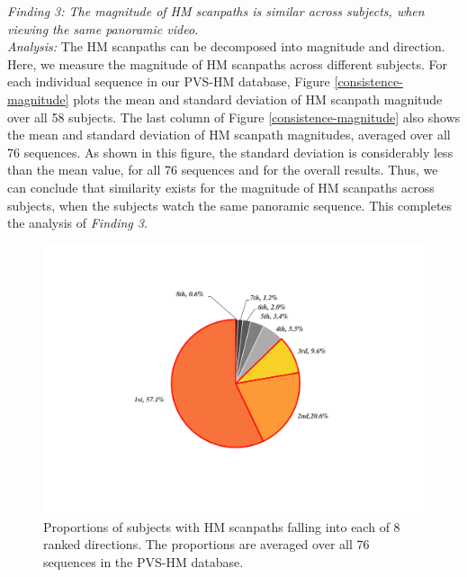 \documentclass[10pt,journal,compsoc]{IEEEtran}
\begin{document}
\emph{Finding 3: The magnitude of HM scanpaths is similar across subjects, when viewing the same panoramic video.}
\\ \textit{Analysis:} The HM scanpaths can be decomposed into magnitude and direction.
 Here, we measure the magnitude of HM scanpaths across different subjects.
For each individual sequence in our PVS-HM database, Figure \ref{consistence-magnitude} plots the mean and standard deviation of HM scanpath magnitude over all 58 subjects.
The last column of Figure \ref{consistence-magnitude} also shows the mean and standard deviation of HM scanpath magnitudes, averaged over all 76 sequences.
As shown in this figure, the standard deviation is considerably less than the mean value, for all 76 sequences and for the overall results.
Thus, we can conclude that similarity exists for the magnitude of HM scanpaths across subjects, when the subjects watch the same panoramic sequence.
This completes the analysis of \textit{Finding 3}.


\begin{figure}
\vspace{-1.5em}
	\begin{center}
		\centerline{\includegraphics[width=.6\columnwidth]{figures/database/direction-consistence-distribution-pie}}%
\vspace{-1em}
		\caption{\footnotesize{Proportions of subjects with HM scanpaths falling into each of 8 ranked directions. The proportions are averaged over all 76 sequences in the PVS-HM database. }}
		\label{direction-consistence-pie}
	\end{center}
\vspace{-2.5em}
\end{figure}
\end{document}
